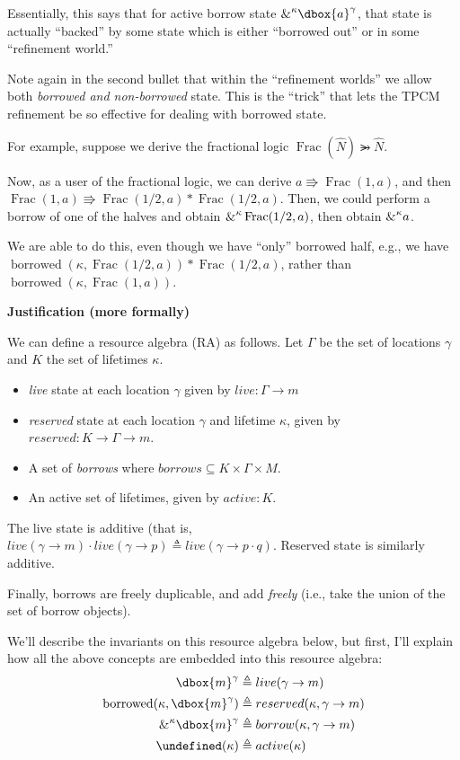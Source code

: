 \documentclass{article}
\newcommand\dboxed[1]{\dbox{\vphantom{t}\ensuremath{#1}}}
\newcommand{\viewshift}{\Rrightarrow}
\DeclareMathOperator{\Frac}{Frac}
\renewcommand{\eqdef}{\triangleq}
\newcommand{\borrow}[2]{\textsc{\&}^{#1}#2}
\newcommand{\refines}{\rightarrowgtr}
\DeclareMathOperator{\borrowed}{borrowed}
\let\active\undefined
\DeclareMathOperator{\active}{active}
\begin{document}
Essentially, this says that for active borrow state $\borrow{\kappa}{\dboxed{a}^\gamma}$,
that state is actually ``backed'' by some state which is either ``borrowed out'' or
in some ``refinement world.''

Note again in the second bullet that within the ``refinement worlds'' we allow both
\emph{borrowed and non-borrowed} state. This is the ``trick'' that lets the
TPCM refinement be so effective for dealing with borrowed state.

For example, suppose we derive the fractional logic
$\Frac(\widehat{N}) \refines \widehat{N}$.

Now, as a user of the fractional logic, we can derive $a \viewshift \Frac(1, a)$,
and then $\Frac(1, a) \viewshift \Frac(1/2, a) * \Frac(1/2, a)$.
Then, we could perform a borrow of one of the halves and obtain
$\borrow{\kappa}{\Frac(1/2, a)}$,
then obtain $\borrow{\kappa}{a}$.

We are able to do this, even though we have ``only'' borrowed half, e.g.,
we have $\borrowed(\kappa, \Frac(1/2, a)) * \Frac(1/2, a)$, rather than
$\borrowed(\kappa, \Frac(1, a))$.

\textbf{Justification (more formally)}

We can define a resource algebra (RA) as follows. Let $\Gamma$ be the set of locations
$\gamma$ and $K$ the set of lifetimes $\kappa$.
\begin{itemize}
  \item \emph{live} state at each location $\gamma$ given by $live : \Gamma \to m$
  \item \emph{reserved} state at each location $\gamma$ and lifetime $\kappa$,
      given by $reserved : K \to \Gamma \to m$.
  \item A set of \emph{borrows} where $borrows \subseteq K \times \Gamma \times M$.
  \item An active set of lifetimes, given by $active : K$.
\end{itemize}

The live state is additive (that is, $live(\gamma \to m) \cdot live(\gamma \to p) \eqdef live(\gamma \to p \cdot q)$.
Reserved state is similarly additive.

Finally, borrows are freely duplicable, and add \emph{freely} (i.e., take the union
of the set of borrow objects).

We'll describe the invariants on this resource algebra below, but first, I'll explain how
all the above concepts are embedded into this resource algebra:
\begin{align*}
 \dboxed{m}^\gamma &\eqdef live(\gamma \to m)\\
 \borrowed(\kappa, \dboxed{m}^\gamma) &\eqdef reserved(\kappa,\gamma \to m)\\
 \borrow{\kappa}{\dboxed{m}^\gamma} &\eqdef borrow(\kappa, \gamma \to m)\\
 \active(\kappa) &\eqdef active(\kappa)
\end{align*}
\end{document}
